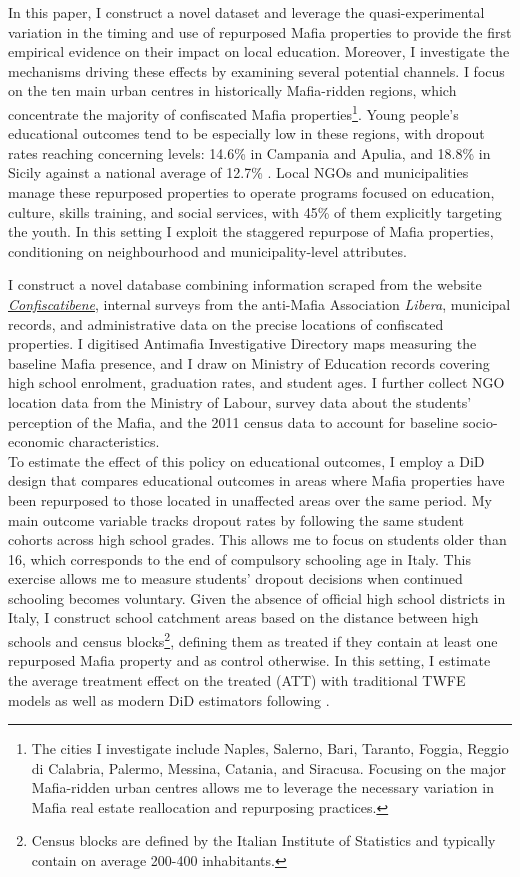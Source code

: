 \documentclass[12pt]{article}
\theoremstyle{plain}
\theoremstyle{plain}
\theoremstyle{plain}
\theoremstyle{definition}
\theoremstyle{plain}
\theoremstyle{definition}
\theoremstyle{plain}
\theoremstyle{remark}
\theoremstyle{definition}
\theoremstyle{definition}
\theoremstyle{plain}
\begin{document}
In this paper, I construct a novel dataset and leverage the quasi-experimental variation in the timing and use of repurposed Mafia properties to provide the first empirical evidence on their impact on local education. Moreover, I investigate the mechanisms driving these effects by examining several potential channels. I focus on the ten main urban centres in historically Mafia-ridden regions, which concentrate the majority of confiscated Mafia properties\footnote{The cities I investigate include Naples, Salerno, Bari, Taranto, Foggia, Reggio di Calabria, Palermo, Messina, Catania, and Siracusa. Focusing on the major Mafia-ridden urban centres allows me to leverage the necessary variation in Mafia real estate reallocation and repurposing practices.}. Young people's educational outcomes tend to be especially low in these regions, with dropout rates reaching concerning levels: 14.6\% in Campania and Apulia, and 18.8\% in Sicily against a national average of 12.7\% \citep{save_the_children_alla_2022}. Local NGOs and municipalities manage these repurposed properties to operate programs focused on education, culture, skills training, and social services, with 45\% of them explicitly targeting the youth. In this setting I exploit the staggered repurpose of Mafia properties, conditioning on neighbourhood and municipality-level attributes. \par
\medskip
I construct a novel database combining information scraped from the website \emph{\href{https://www.confiscatibene.it/}{Confiscatibene}}, internal surveys from the anti-Mafia Association \emph{Libera}, municipal records, and administrative data on the precise locations of confiscated properties. I digitised Antimafia Investigative Directory maps measuring the baseline Mafia presence, and I draw on Ministry of Education records covering high school enrolment, graduation rates, and student ages. I further collect NGO location data from the Ministry of Labour, survey data about the students' perception of the Mafia, and the 2011 census data to account for baseline socio-economic characteristics. \\
To estimate the effect of this policy on educational outcomes, I employ a DiD design that compares educational outcomes in areas where Mafia properties have been repurposed to those located in unaffected areas over the same period. My main outcome variable tracks dropout rates by following the same student cohorts across high school grades. This allows me to focus on students older than 16, which corresponds to the end of compulsory schooling age in Italy. This exercise allows me to measure students' dropout decisions when continued schooling becomes voluntary. Given the absence of official high school districts in Italy, I construct school catchment areas based on the distance between high schools and census blocks\footnote{Census blocks are defined by the Italian Institute of Statistics and typically contain on average 200-400 inhabitants.}, defining them as treated if they contain at least one repurposed Mafia property and as control otherwise. In this setting, I estimate the average treatment effect on the treated (ATT) with traditional TWFE models as well as modern DiD estimators following \citet{sun_estimating_2021}. \par
\end{document}
